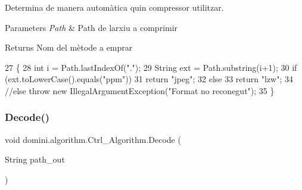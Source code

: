 Determina de manera automàtica quin compressor utilitzar. 


\begin{DoxyParams}{Parameters}
{\em Path} & Path de l\textquotesingle{}arxiu a comprimir \\
\hline
\end{DoxyParams}
\begin{DoxyReturn}{Returns}
Nom del mètode a emprar 
\end{DoxyReturn}

\begin{DoxyCode}
27     \{
28         \textcolor{keywordtype}{int} i = Path.lastIndexOf(\textcolor{stringliteral}{"."});
29         String ext = Path.substring(i+1);
30         \textcolor{keywordflow}{if} (ext.toLowerCase().equals(\textcolor{stringliteral}{"ppm"})) 
31             \textcolor{keywordflow}{return} \textcolor{stringliteral}{"jpeg"};
32         \textcolor{keywordflow}{else}  
33             \textcolor{keywordflow}{return} \textcolor{stringliteral}{"lzw"};
34         \textcolor{comment}{//else throw new IllegalArgumentException("Format no reconegut");}
35     \}
\end{DoxyCode}
\mbox{\label{classdomini_1_1algorithm_1_1Ctrl__Algorithm_a344b213ee2eb3e0ed3306883624c5128}} 
\subsubsection{\texorpdfstring{Decode()}{Decode()}}
{\footnotesize\ttfamily void domini.\+algorithm.\+Ctrl\+\_\+\+Algorithm.\+Decode (\begin{DoxyParamCaption}\item[{String}]{path\+\_\+out }\end{DoxyParamCaption})\hspace{0.3cm}{\ttfamily [inline]}}


